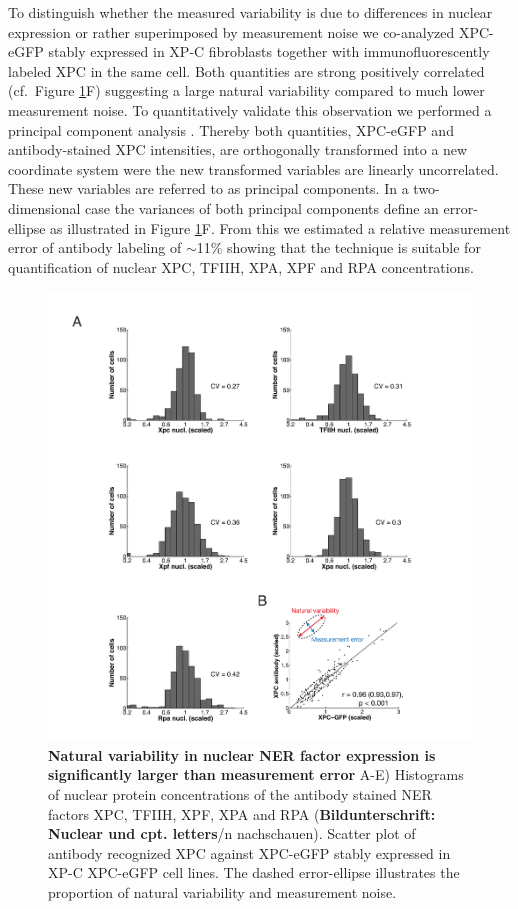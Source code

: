 To distinguish whether the measured variability is due to differences in nuclear expression or rather superimposed by measurement noise we co-analyzed XPC-eGFP stably expressed in XP-C fibroblasts together with immunofluorescently labeled XPC in the same cell. Both quantities are strong positively correlated (cf.\ Figure \ref{fig:ProteinDist}F) suggesting a large natural variability compared to much lower measurement noise. To quantitatively validate this observation we performed a principal component analysis \cite{Pearson1901}. Thereby both quantities, XPC-eGFP and antibody-stained XPC intensities, are orthogonally transformed into a new coordinate system were the new transformed variables are linearly uncorrelated. These new variables are referred to as principal components. In a two-dimensional case the variances of both principal components define an error-ellipse as illustrated in Figure \ref{fig:ProteinDist}F. From this we estimated a relative measurement error of antibody labeling of $\sim$11\% showing that the technique is suitable for quantification of nuclear XPC, TFIIH, XPA, XPF and RPA concentrations.       

\begin{figure}[htbp]
	\begin{center}
		\includegraphics[width=1\textwidth]{Abbildungen/figure3_2.pdf}
		\caption{\textbf{Natural variability in nuclear NER factor expression is significantly larger than measurement error} A-E) Histograms of nuclear protein concentrations of the antibody stained NER factors XPC, TFIIH, XPF, XPA and RPA (\textbf{Bildunterschrift: Nuclear und cpt. letters}/n nachschauen). Scatter plot of antibody recognized XPC against XPC-eGFP stably expressed in XP-C XPC-eGFP cell lines. The dashed error-ellipse illustrates the proportion of natural variability and measurement noise.}
		\label{fig:ProteinDist}
	\end{center}
\end{figure}

